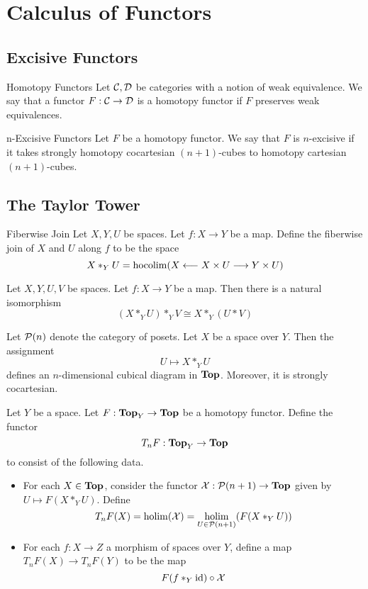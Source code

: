 \documentclass[a4paper]{article}
\begin{document}
\pagebreak
\section{Calculus of Functors}
\subsection{Excisive Functors}
\begin{defn}{Homotopy Functors}{} Let $\mathcal{C},\mathcal{D}$ be categories with a notion of weak equivalence. We say that a functor $F:\mathcal{C}\to\mathcal{D}$ is a homotopy functor if $F$ preserves weak equivalences. 
\end{defn}

\begin{defn}{n-Excisive Functors}{} Let $F$ be a homotopy functor. We say that $F$ is $n$-excisive if it takes strongly homotopy cocartesian $(n+1)$-cubes to homotopy cartesian $(n+1)$-cubes. 
\end{defn}

\subsection{The Taylor Tower}
\begin{defn}{Fiberwise Join}{} Let $X,Y,U$ be spaces. Let $f:X\to Y$ be a map. Define the fiberwise join of $X$ and $U$ along $f$ to be the space $$X\ast_YU=\operatorname*{hocolim}(X\longleftarrow X\times U\longrightarrow Y\times U)$$
\end{defn}

\begin{lmm}{}{} Let $X,Y,U,V$ be spaces. Let $f:X\to Y$ be a map. Then there is a natural isomorphism $$(X\ast_YU)\ast_YV\cong X\ast_Y(U\ast V)$$
\end{lmm}

\begin{prp}{}{} Let $\mathcal{P}(n)$ denote the category of posets. Let $X$ be a space over $Y$. Then the assignment $$U\mapsto X\ast_YU$$ defines an $n$-dimensional cubical diagram in $\bold{Top}$. Moreover, it is strongly cocartesian. 
\end{prp}

\begin{defn}{}{} Let $Y$ be a space. Let $F:\bold{Top}_Y\to\bold{Top}$ be a homotopy functor. Define the functor $$T_nF:\bold{Top}_Y\to\bold{Top}$$ to consist of the following data. 
\begin{itemize}
\item For each $X\in\bold{Top}$, consider the functor $\mathcal{X}:\mathcal{P}(n+1)\to\bold{Top}$ given by $U\mapsto F(X\ast_YU)$. Define $$T_nF(X)=\operatorname*{holim}(\mathcal{X})=\operatorname*{holim}_{U\in\mathcal{P}(n+1)}(F(X\ast_YU))$$
\item For each $f:X\to Z$ a morphism of spaces over $Y$, define a map $T_nF(X)\to T_nF(Y)$ to be the map $$F(f\ast_Y\text{id})\circ\mathcal{X}$$
\end{itemize}
\end{defn}
\end{document}
